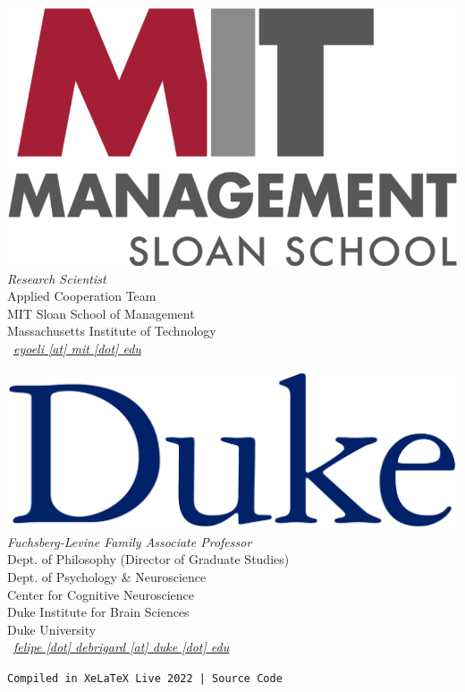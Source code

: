 \documentclass[10pt, a4paper, english]{cv-public}
\begin{document}
\begin{multicols}{2}
{}
\raggedright{
    \signature{\href{https://erezyoeli.com/}{Erez Yoeli, Ph.D.}} \includegraphics[scale=.015]{img/MIT_Sloan.png} \\
    \textsl{Research Scientist} \\
    Applied Cooperation Team \\
    MIT Sloan School of Management \\
    Massachusetts Institute of Technology  \\
    {\footnotesize \faEnvelope} \ \textit{\href{mailto:eyoli@mit.edu}{eyoeli [at] mit [dot] edu}} \\
}

\vspace{20pt}

\raggedright{
    \signature{\href{https://philosophy.duke.edu/people/felipe-de-brigard}{Felipe De Brigard, Ph.D.}} \includegraphics[scale=.1]{img/duke_wordmark_navyblue.png} \\
    \textsl{Fuchsberg-Levine Family Associate Professor} \\
    Dept. of Philosophy (Director of Graduate Studies) \\
    Dept. of Psychology \& Neuroscience \\
    Center for Cognitive Neuroscience \\
    Duke Institute for Brain Sciences \\
    Duke University \\
    {\footnotesize \faEnvelope} \ \textit{\href{mailto:felipe.debrigard@duke.edu}{felipe [dot] debrigard [at] duke [dot] edu}} \\
}
\end{multicols}

\vfill
\texttt{Compiled in Xe\LaTeX \ Live 2022 | Source Code \href{https://github.com/1nathanliang/cv_public}{\faExternalLink*}}
\end{document}
